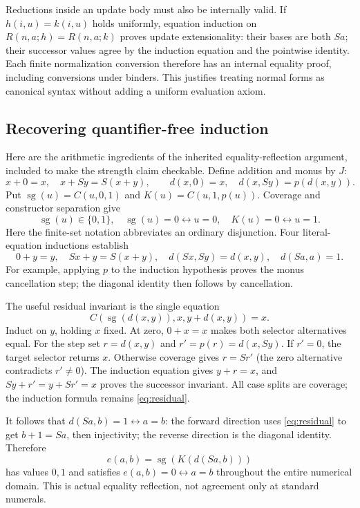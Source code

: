 \documentclass[11pt,letterpaper]{article}
\theoremstyle{definition}\newtheorem{definition}[theorem]{Definition}
\theoremstyle{remark}\newtheorem{remark}[theorem]{Remark}
\begin{document}
Reductions inside an update body must also be internally valid. If
$h(i,u)=k(i,u)$ holds uniformly, equation induction on
$R(n,a;h)=R(n,a;k)$ proves update extensionality: their bases are
both $Sa$; their successor values agree by the induction equation and
the pointwise identity. Each finite normalization conversion therefore
has an internal equality proof, including conversions under binders.
This justifies treating normal forms as canonical syntax without adding
a uniform evaluation axiom.

\subsection{Recovering quantifier-free induction}\label{sec:reflection}
Here are the arithmetic ingredients of the inherited equality-reflection
argument, included to make the strength claim checkable. Define addition
and monus by $J$:
\[
 x+0=x,\quad x+Sy=S(x+y),\qquad
 d(x,0)=x,\quad d(x,Sy)=p(d(x,y)).
\]
Put $\operatorname{sg}(u)=C(u,0,1)$ and $K(u)=C(u,1,p(u))$.
Coverage and constructor separation give
\[
 \operatorname{sg}(u)\in\{0,1\},\quad
 \operatorname{sg}(u)=0\leftrightarrow u=0,\quad
 K(u)=0\leftrightarrow u=1.
\]
Here the finite-set notation abbreviates an ordinary disjunction.
Four literal-equation inductions establish
\[
 0+y=y,\quad Sx+y=S(x+y),\quad
 d(Sx,Sy)=d(x,y),\quad d(Sa,a)=1.
\]
For example, applying $p$ to the induction hypothesis proves the monus
cancellation step; the diagonal identity then follows by cancellation.

The useful residual invariant is the single equation
\begin{equation}\label{eq:residual}
 C(\operatorname{sg}(d(x,y)),x,y+d(x,y))=x.
\end{equation}
Induct on $y$, holding $x$ fixed. At zero, $0+x=x$ makes both
selector alternatives equal. For the step set $r=d(x,y)$ and
$r'=p(r)=d(x,Sy)$. If $r'=0$, the target selector returns $x$.
Otherwise coverage gives $r=Sr'$ (the zero alternative contradicts
$r'\ne0$). The induction equation gives $y+r=x$, and
$Sy+r'=y+Sr'=x$ proves the successor invariant. All case splits are
coverage; the induction formula remains \eqref{eq:residual}.

It follows that $d(Sa,b)=1\leftrightarrow a=b$: the forward direction
uses \eqref{eq:residual} to get $b+1=Sa$, then injectivity; the reverse
direction is the diagonal identity. Therefore
\[
 e(a,b)=\operatorname{sg}(K(d(Sa,b)))
\]
has values $0,1$ and satisfies $e(a,b)=0\leftrightarrow a=b$
throughout the entire numerical domain. This is actual equality
reflection, not agreement only at standard numerals.
\end{document}
